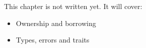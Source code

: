 \label{ch:rust1}
\begin{keyidea}
This chapter is not written yet. It will cover:
\begin{itemize}[nosep]
  \item Ownership and borrowing
  \item Types, errors and traits
\end{itemize}
\end{keyidea}
